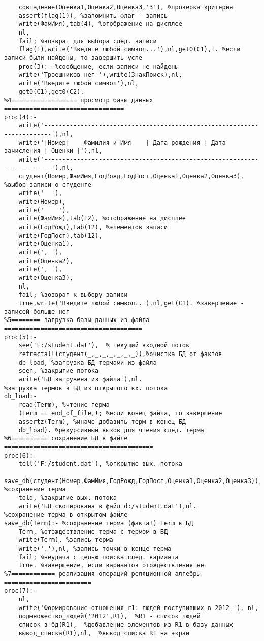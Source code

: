 \documentclass[a4paper,14pt]{extarticle}
\begin{document}
\begin{lstlisting}
    совпадение(Оценка1,Оценка2,Оценка3,'3'), %проверка критерия
    assert(flag(1)), %запомнить флаг – запись
    write(ФамИмя),tab(4), %отображение на дисплее
    nl,
    fail; %возврат для выбора след. записи
    flag(1),write('Введите любой символ...'),nl,get0(C1),!. %eсли записи были найдены, то завершить успе
    proc(3):- %cообщение, если записи не найдены
    write('Троешников нет '),write(ЗнакПоиск),nl,
    write('Введите любой символ'),nl,
    get0(C1),get0(C2).
%4================== просмотр базы данных =================================
proc(4):-
    write('------------------------------------------------------------------------'),nl,
    write('|Номер|    Фамилия и Имя    | Дата рождения | Дата зачисления | Оценки |'),nl,
    write('------------------------------------------------------------------------'),nl,
    студент(Номер,ФамИмя,ГодРожд,ГодПост,Оценка1,Оценка2,Оценка3), %выбор записи о студенте
    write('  '),
    write(Номер),
    write('    '),
    write(ФамИмя),tab(12), %отображение на дисплее
    write(ГодРожд),tab(12), %элементов запаси
    write(ГодПост),tab(12),
    write(Оценка1),
    write(', '),
    write(Оценка2),
    write(', '),
    write(Оценка3),
    nl,
    fail; %возврат к выбору записи
    true,write('Введите любой символ..'),nl,get(C1). %завершение - записей больше нет
%5======== загрузка базы данных из файла ======================================
proc(5):-
    see('F:/student.dat'),  % текущий входной поток
    retractall(студент(_,_,_,_,_,_,_)),%очистка БД от фактов
    db_load, %загрузка БД термами из файла
    seen, %закрытие потока
    write('БД загружена из файла'),nl.
%загрузка термов в БД из открытого вх. потока
db_load:-
    read(Term), %чтение терма
    (Term == end_of_file,!; %если конец файла, то завершение
    assertz(Term), %иначе добавить терм в конец БД
    db_load). %рекурсивный вызов для чтения след. терма
%6========== сохранение БД в файле =========================================
proc(6):-
    tell('F:/student.dat'), %открытие вых. потока
    save_db(студент(Номер,ФамИмя,ГодРожд,ГодПост,Оценка1,Оценка2,Оценка3)), %сохранение терма
    told, %закрытие вых. потока
    write('БД скопирована в файл d:/student.dat'),nl.
%сохранение терма в открытом файле
save_db(Term):- %сохранение терма (факта!) Term в БД
    Term, %отождествление терма с термом в БД
    write(Term), %запись терма
    write('.'),nl, %запись точки в конце терма
    fail; %неудача с целью поиска след. варианта
    true. %завершение, если вариантов отождествления нет
%7============ реализация операций реляционной алгебры ========================
proc(7):-
    nl,
    write('Формирование отношения r1: людей поступивших в 2012 '), nl,
    подмножество_людей('2012',R1),  %R1 - список людей
    список_в_бд(R1),  %добавление элементов из R1 в базу данных
    вывод_списка(R1),nl,  %вывод списка R1 на экран


\end{lstlisting}
\end{document}
